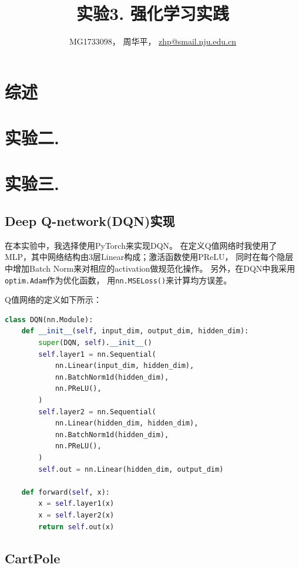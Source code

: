 \documentclass[a4paper,UTF8]{article}
\theoremstyle{definition}
\begin{document}
\title{实验3. 强化学习实践}
\author{MG1733098， 周华平， \url{zhp@smail.nju.edu.cn}}
\maketitle

\section*{综述}



\section*{实验二.}



\section*{实验三.}


\subsection*{Deep Q-network(DQN)实现}

在本实验中，我选择使用PyTorch来实现DQN。
在定义Q值网络时我使用了MLP，其中网络结构由3层Linear构成；激活函数使用PReLU，
同时在每个隐层中增加Batch Norm来对相应的activation做规范化操作。
另外，在DQN中我采用\lstinline[language=Python]{optim.Adam}作为优化函数，
用\lstinline[language=Python]{nn.MSELoss()}来计算均方误差。

Q值网络的定义如下所示：

\begin{lstlisting}[language=Python]
class DQN(nn.Module):
    def __init__(self, input_dim, output_dim, hidden_dim):
        super(DQN, self).__init__()
        self.layer1 = nn.Sequential(
            nn.Linear(input_dim, hidden_dim),
            nn.BatchNorm1d(hidden_dim),
            nn.PReLU(),
        )
        self.layer2 = nn.Sequential(
            nn.Linear(hidden_dim, hidden_dim),
            nn.BatchNorm1d(hidden_dim),
            nn.PReLU(),
        )
        self.out = nn.Linear(hidden_dim, output_dim)

    def forward(self, x):
        x = self.layer1(x)
        x = self.layer2(x)
        return self.out(x)
\end{lstlisting}

\subsection*{CartPole}
\end{document}
